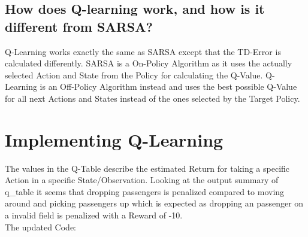 \documentclass[a4paper, 11pt]{article}
\begin{document}
\subsection{How does Q-learning work, and how is it different from SARSA?}
Q-Learning works exactly the same as SARSA except that the TD-Error is calculated differently. SARSA is a On-Policy Algorithm as it uses the actually selected Action and State from the Policy for calculating the Q-Value. 
Q-Learning is an Off-Policy Algorithm instead and uses the best possible Q-Value for all next Actions and States instead of the ones selected by the Target Policy.

\section{Implementing Q-Learning}
The values in the Q-Table describe the estimated Return for taking a specific Action in a specific State/Observation. Looking at the output summary of q\_table it seems that dropping passengers is penalized compared to moving around and picking passengers up which is expected as dropping an passenger on a invalid field is penalized with a Reward of -10. \\
The updated Code:\\
\end{document}
